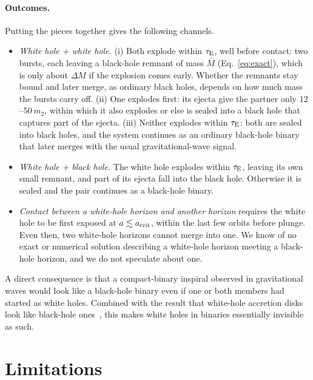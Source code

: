 \documentclass[11pt,a4paper]{article}
\newcommand{\dM}{\Delta M}
\newcommand{\tauE}{\tau_{\rm E}}
\begin{document}
\paragraph{Outcomes.} Putting the pieces together gives the following channels.
\begin{itemize}
\item \emph{White hole + white hole.} (i) Both explode within $\tauE$, well before contact: two bursts, each leaving a black-hole remnant of mass $\overline M$ (Eq.~\ref{eq:exact}), which is only about $\dM$ if the explosion comes early. Whether the remnants stay bound and later merge, as ordinary black holes, depends on how much mass the bursts carry off. (ii) One explodes first: its ejecta give the partner only $12$--$50\,m_2$, within which it also explodes or else is sealed into a black hole that captures part of the ejecta. (iii) Neither explodes within $\tauE$: both are sealed into black holes, and the system continues as an ordinary black-hole binary that later merges with the usual gravitational-wave signal.
\item \emph{White hole + black hole.} The white hole explodes within $\tauE$, leaving its own small remnant, and part of its ejecta fall into the black hole. Otherwise it is sealed and the pair continues as a black-hole binary.
\item \emph{Contact between a white-hole horizon and another horizon} requires the white hole to be first exposed at $a \lesssim a_{\rm crit}$, within the last few orbits before plunge. Even then, two white-hole horizons cannot merge into one. We know of no exact or numerical solution describing a white-hole horizon meeting a black-hole horizon, and we do not speculate about one.
\end{itemize}
A direct consequence is that a compact-binary inspiral observed in gravitational waves would look like a black-hole binary even if one or both members had started as white holes. Combined with the result that white-hole accretion disks look like black-hole ones~\cite{Li2025}, this makes white holes in binaries essentially invisible as such.

\section{Limitations}\label{sec:limits}
\end{document}
